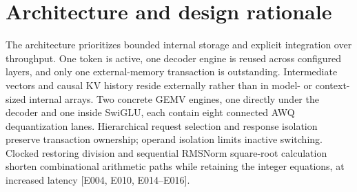 \documentclass[11pt,a4paper]{article}
\begin{document}
\section{Architecture and design rationale}

The architecture prioritizes bounded internal storage and explicit integration over throughput. One token is active,\allowbreak{} one decoder engine is reused across configured layers,\allowbreak{} and only one external-memory transaction is outstanding. Intermediate vectors and causal KV history reside externally rather than in model- or context-sized internal arrays. Two concrete GEMV engines,\allowbreak{} one directly under the decoder and one inside SwiGLU,\allowbreak{} each contain eight connected AWQ dequantization lanes. Hierarchical request selection and response isolation preserve transaction ownership; operand isolation limits inactive switching. Clocked restoring division and sequential RMSNorm square-root calculation shorten combinational arithmetic paths while retaining the integer equations,\allowbreak{} at increased latency [\allowbreak{}E004,\allowbreak{} E010,\allowbreak{} E014–E016]\allowbreak{}.
\end{document}

